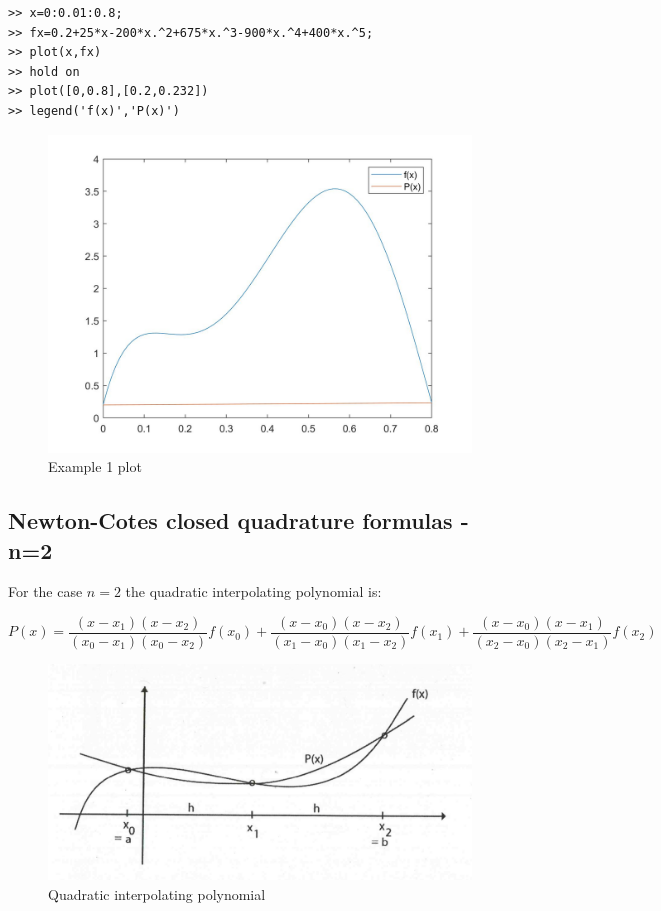 \documentclass [titlepage,12pt,letter] {article}
\begin{document}
\begin{verbatim}
>> x=0:0.01:0.8;
>> fx=0.2+25*x-200*x.^2+675*x.^3-900*x.^4+400*x.^5;
>> plot(x,fx)
>> hold on
>> plot([0,0.8],[0.2,0.232])
>> legend('f(x)','P(x)')
\end{verbatim}

\begin{figure} 
  \centering
  \includegraphics[scale=0.3]{lect15_ex1}
  \caption{Example 1 plot}
  \label{fig:lect15_ex1}
\end{figure}


\subsection{Newton-Cotes closed quadrature formulas - n=2} 

For the case $n=2$ the quadratic interpolating polynomial is: 

\[
P(x) = \frac{(x-x_1)(x-x_2)}{(x_0-x_1)(x_0-x_2)}f(x_0)
+ \frac{(x-x_0)(x-x_2)}{(x_1-x_0)(x_1-x_2)}f(x_1)
+ \frac{(x-x_0)(x-x_1)}{(x_2-x_0)(x_2-x_1)}f(x_2)
\]
\begin{figure} 
  \centering
  \includegraphics[scale=0.6]{quadratic_interpolating}
  \caption{Quadratic interpolating polynomial}
  \label{fig:linear}
\end{figure}
\end{document}
